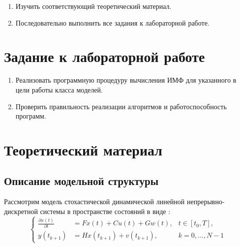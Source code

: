 \documentclass[a4paper,14pt]{extarticle}
\renewcommand{\vec}[1]{#1}
\newcommand{\pd}[2]{\frac{\partial #1}{\partial #2}}
\begin{document}
\begin{enumerate}

\item Изучить соответствующий теоретический материал.

\item Последовательно выполнить все задания к лабораторной работе.

\end{enumerate}

\section{Задание к лабораторной работе}

\begin{enumerate}

	\item Реализовать программную процедуру вычисления ИМФ для указанного в цели
		работы класса моделей.

	\item Проверить правильность реализации алгоритмов и работоспособность
		программ.

\end{enumerate}

\section{Теоретический материал}

\subsection{Описание модельной структуры}

Рассмотрим модель стохастической динамической линейной \newline
непрерывно-дискретной системы в пространстве состояний в виде \cite{mono}:
\begin{equation}
  \label{eq:initmod}
  \left\{ 
    \begin{array}{lll}
			\pd{\vec{x}(t)}{t} &= F \vec{x}(t) + C \vec{u}(t) + G \vec{w}(t),
				& t \in [t_0, T], \\
      \vec{y}(t_{k+1}) &= H \vec{x}(t_{k+1}) + \vec{v}(t_{k+1}), 
				& k = 0,\ldots, N-1
    \end{array} 
  \right. 
\end{equation}
\end{document}
